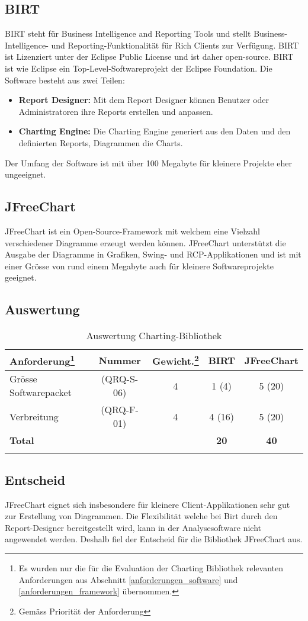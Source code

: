 \subsection{BIRT}
BIRT steht für Business Intelligence and Reporting Tools und stellt Business-Intelligence- und Reporting-Funktionalität für Rich Clients zur Verfügung. BIRT ist Lizenziert unter der Eclipse Public License und ist daher open-source. BIRT ist wie Eclipse ein Top-Level-Softwareprojekt der Eclipse Foundation. Die Software besteht aus zwei Teilen:
\begin{itemize}
\item \textbf{Report Designer: }Mit dem Report Designer können Benutzer oder Administratoren ihre Reports erstellen und anpassen. 
\item \textbf{Charting Engine: }Die Charting Engine generiert aus den Daten und den definierten Reports, Diagrammen die Charts.
\end{itemize} 

Der Umfang der Software ist mit über 100 Megabyte für kleinere Projekte eher ungeeignet.

\subsection{JFreeChart}
JFreeChart ist ein Open-Source-Framework mit welchem eine Vielzahl verschiedener Diagramme erzeugt werden können. JFreeChart unterstützt die Ausgabe der Diagramme in Grafiken, Swing- und RCP-Applikationen und ist mit einer Grösse von rund einem Megabyte auch für kleinere Softwareprojekte geeignet.

\subsection{Auswertung}
\begin{longtable}{|p{4cm}|c|c|c|c|}\hline
 \textbf{Anforderung\footnote{Es wurden nur die für die Evaluation der Charting Bibliothek relevanten Anforderungen aus Abschnitt \ref{anforderungen_software} und \ref{anforderungen_framework} übernommen.}} & \textbf{Nummer} &  \textbf{Gewicht.\footnote{Gemäss Priorität der Anforderung}} & \textbf{BIRT} & \textbf{JFreeChart}\\\hline
   Grösse Softwarepacket & (QRQ-S-06) & 4 & 1 (4) & 5 (20) \\\hline
   Verbreitung & (QRQ-F-01) & 4 & 4 (16) & 5 (20) \\\hline
   \textbf{Total} & && \textbf{20}  & \textbf{40} \\\hline
    \caption{Auswertung Charting-Bibliothek}
\end{longtable}

\subsection{Entscheid}
JFreeChart eignet sich insbesondere für kleinere Client-Applikationen sehr gut zur Erstellung von Diagrammen. Die Flexibilität welche bei Birt durch den Report-Designer bereitgestellt wird, kann in der Analysesoftware nicht angewendet werden. Deshalb fiel der Entscheid für die Bibliothek JFreeChart aus.
